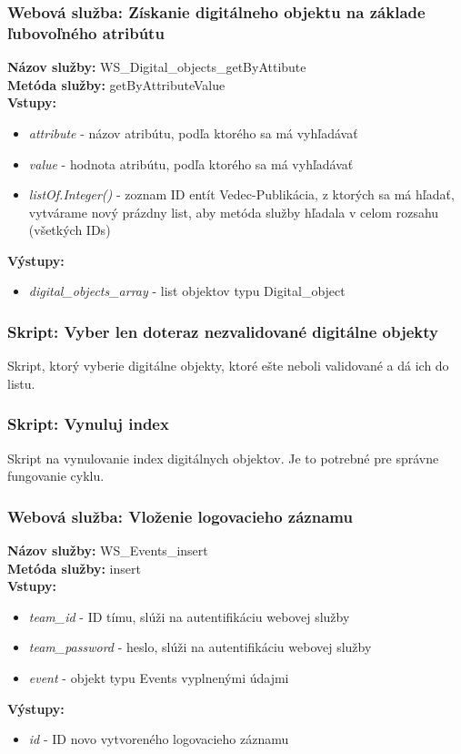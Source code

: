 \documentclass[10pt,oneside,slovak,a4paper]{article}
\begin{document}
\subsubsection{Webová služba: Získanie digitálneho objektu na základe ľubovoľného atribútu}
\textbf{Názov služby:} WS\_Digital\_objects\_getByAttibute\\
\textbf{Metóda služby:} getByAttributeValue\\
\textbf{Vstupy:}
	\begin{itemize}
		\item \textit{attribute} - názov atribútu, podľa ktorého sa má vyhľadávať
		\item \textit{value} - hodnota atribútu, podľa ktorého sa má vyhľadávať
		\item \textit{listOf.Integer()} - zoznam ID entít Vedec-Publikácia, z ktorých sa má hľadať, vytvárame nový prázdny list, aby metóda služby hľadala v celom rozsahu (všetkých IDs)
	\end{itemize}
\textbf{Výstupy:}
	\begin{itemize}
		\item \textit{digital\_objects\_array} - list objektov typu Digital\_object
	\end{itemize}
	
\subsubsection{Skript: Vyber len doteraz nezvalidované digitálne objekty}
Skript, ktorý vyberie digitálne objekty, ktoré ešte neboli validované a dá ich do listu.

\subsubsection{Skript: Vynuluj index}
Skript na vynulovanie index digitálnych objektov. Je to potrebné pre správne fungovanie cyklu.

\subsubsection{Webová služba: Vloženie logovacieho záznamu}
\textbf{Názov služby:} WS\_Events\_insert\\
\textbf{Metóda služby:} insert\\
\textbf{Vstupy:}
	\begin{itemize}
		\item \textit{team\_id} - ID tímu, slúži na autentifikáciu webovej služby
		\item \textit{team\_password} - heslo, slúži na autentifikáciu webovej služby
		\item \textit{event} - objekt typu Events vyplnenými údajmi
	\end{itemize}
\textbf{Výstupy:}
	\begin{itemize}
		\item \textit{id} - ID novo vytvoreného logovacieho záznamu
	\end{itemize}
	
\end{document}
